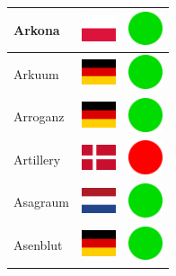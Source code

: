 \documentclass[12pt, a4paper, twoside]{report}
\begin{document}
\begin{center}
\begin{longtable}{|p{5cm}|p{2cm}|p{2cm}|}
 Arkona                                                     & \includegraphics[width=1cm]{4x3/pl} &   \includegraphics[width=1cm]{likes/y} \\ \hline
 Arkuum                                                     & \includegraphics[width=1cm]{4x3/de} &   \includegraphics[width=1cm]{likes/y} \\ \hline
 Arroganz                                                   & \includegraphics[width=1cm]{4x3/de} &   \includegraphics[width=1cm]{likes/y} \\ \hline
 Artillery                                                  & \includegraphics[width=1cm]{4x3/dk} &   \includegraphics[width=1cm]{likes/n} \\ \hline
 Asagraum                                                   & \includegraphics[width=1cm]{4x3/nl} &   \includegraphics[width=1cm]{likes/y} \\ \hline
 Asenblut                                                   & \includegraphics[width=1cm]{4x3/de} &   \includegraphics[width=1cm]{likes/y} \\ \hline

\end{longtable}
\end{center}
\end{document}
